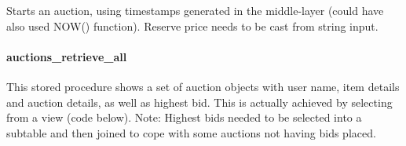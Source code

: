 Starts an auction, using timestamps generated in the middle-layer (could
have also used NOW() function). Reserve price needs to be cast from
string input.

\begin{Shaded}
\begin{Highlighting}[]
  \NormalTok{(}\NormalTok{), } \NormalTok{, } \NormalTok{, } \NormalTok{(}\NormalTok{))}
      
     \NormalTok{(}\NormalTok{,}\NormalTok{)));}
     
\end{Highlighting}
\end{Shaded}

\paragraph{auctions\_retrieve\_all}\label{auctionsux5fretrieveux5fall}

This stored procedure shows a set of auction objects with user name,
item details and auction details, as well as highest bid. This is
actually achieved by selecting from a view (code below). Note: Highest
bids needed to be selected into a subtable and then joined to cope with
some auctions not having bids placed.

